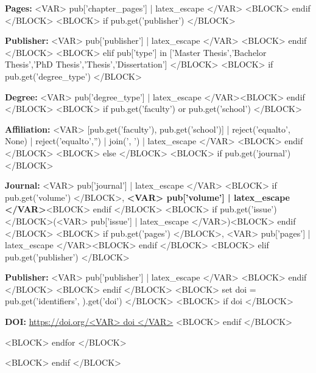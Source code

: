 \begin{cventries}
{\begin{cvitems}
            \item {\textbf{Pages:} <VAR> pub['chapter_pages'] | latex_escape </VAR>}
          <BLOCK> endif </BLOCK>
          <BLOCK> if pub.get('publisher') </BLOCK>
            \item {\textbf{Publisher:} <VAR> pub['publisher'] | latex_escape </VAR>}
          <BLOCK> endif </BLOCK>
        <BLOCK> elif pub['type'] in ['Master Thesis','Bachelor Thesis','PhD Thesis','Thesis','Dissertation'] </BLOCK>
          <BLOCK> if pub.get('degree_type') </BLOCK>\item {\textbf{Degree:} <VAR> pub['degree_type'] | latex_escape </VAR>}<BLOCK> endif </BLOCK>
          <BLOCK> if pub.get('faculty') or pub.get('school') </BLOCK>
            \item {\textbf{Affiliation:} <VAR> [pub.get('faculty'), pub.get('school')] | reject('equalto', None) | reject('equalto','') | join(', ') | latex_escape </VAR>}
          <BLOCK> endif </BLOCK>
        <BLOCK> else </BLOCK>
          <BLOCK> if pub.get('journal') </BLOCK>
            \item {%
              \textbf{Journal:} <VAR> pub['journal'] | latex_escape </VAR>
              <BLOCK> if pub.get('volume') </BLOCK>, \textbf{<VAR> pub['volume'] | latex_escape </VAR>}<BLOCK> endif </BLOCK>
              <BLOCK> if pub.get('issue') </BLOCK>(<VAR> pub['issue'] | latex_escape </VAR>)<BLOCK> endif </BLOCK>
              <BLOCK> if pub.get('pages') </BLOCK>, <VAR> pub['pages'] | latex_escape </VAR><BLOCK> endif </BLOCK>
            }
          <BLOCK> elif pub.get('publisher') </BLOCK>
            \item {\textbf{Publisher:} <VAR> pub['publisher'] | latex_escape </VAR>}
          <BLOCK> endif </BLOCK>
        <BLOCK> endif </BLOCK>
        <BLOCK> set doi = pub.get('identifiers', {}).get('doi') </BLOCK>
        <BLOCK> if doi </BLOCK>
          \item {\textbf{DOI:} \href{https://doi.org/<VAR> doi </VAR>}{https://doi.org/<VAR> doi </VAR>}}
        <BLOCK> endif </BLOCK>
      \end{cvitems}
    }
<BLOCK> endfor </BLOCK>
\end{cventries}
<BLOCK> endif </BLOCK>
